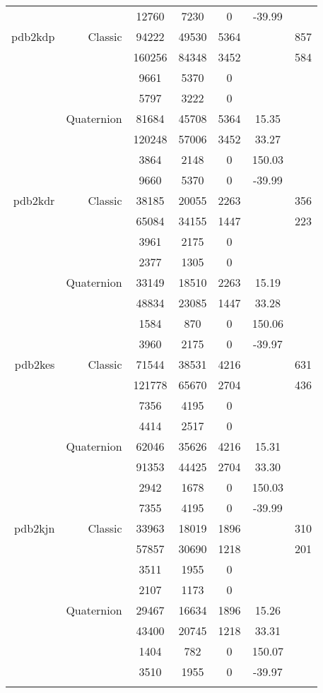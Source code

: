 \begin{xltabular}{\textwidth}{r|rcccSc}
& & 12760 & 7230 & 0 & -39.99 & \\ \addlinespace
pdb2kdp & Classic & 94222 & 49530 & 5364 & & 857 \\
& & 160256 & 84348 & 3452 & & 584 \\
& & 9661 & 5370 & 0 & & \\
& & 5797 & 3222 & 0 & & \\
& Quaternion & 81684 & 45708 & 5364 & 15.35 & \\
& & 120248 & 57006 & 3452 & 33.27 & \\
& & 3864 & 2148 & 0 & 150.03 & \\
& & 9660 & 5370 & 0 & -39.99 & \\ \addlinespace
pdb2kdr & Classic & 38185 & 20055 & 2263 & & 356 \\
& & 65084 & 34155 & 1447 & & 223 \\
& & 3961 & 2175 & 0 & & \\
& & 2377 & 1305 & 0 & & \\
& Quaternion & 33149 & 18510 & 2263 & 15.19 & \\
& & 48834 & 23085 & 1447 & 33.28 & \\
& & 1584 & 870 & 0 & 150.06 & \\
& & 3960 & 2175 & 0 & -39.97 & \\ \addlinespace
pdb2kes & Classic & 71544 & 38531 & 4216 & & 631 \\
& & 121778 & 65670 & 2704 & & 436 \\
& & 7356 & 4195 & 0 & & \\
& & 4414 & 2517 & 0 & & \\
& Quaternion & 62046 & 35626 & 4216 & 15.31 & \\
& & 91353 & 44425 & 2704 & 33.30 & \\
& & 2942 & 1678 & 0 & 150.03 & \\
& & 7355 & 4195 & 0 & -39.99 & \\ \addlinespace
pdb2kjn & Classic & 33963 & 18019 & 1896 & & 310 \\
& & 57857 & 30690 & 1218 & & 201 \\
& & 3511 & 1955 & 0 & & \\
& & 2107 & 1173 & 0 & & \\
& Quaternion & 29467 & 16634 & 1896 & 15.26 & \\
& & 43400 & 20745 & 1218 & 33.31 & \\
& & 1404 & 782 & 0 & 150.07 & \\
& & 3510 & 1955 & 0 & -39.97 & \\ \addlinespace

\end{xltabular}
